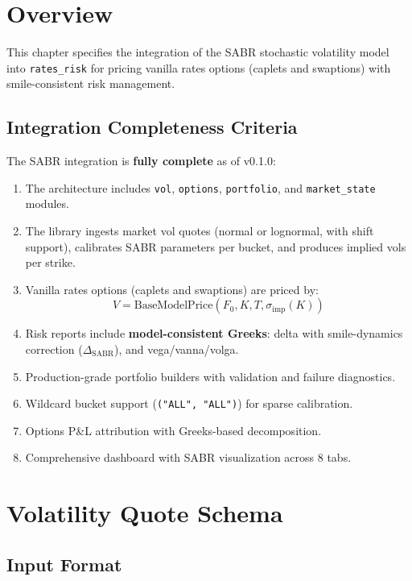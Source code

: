 \documentclass[12pt,a4paper]{report}
\newcommand{\code}[1]{\texttt{#1}}
\begin{document}
\section{Overview}

This chapter specifies the integration of the SABR stochastic volatility model into \code{rates_risk} for pricing vanilla rates options (caplets and swaptions) with smile-consistent risk management.

\subsection{Integration Completeness Criteria}

The SABR integration is \textbf{fully complete} as of v0.1.0:
\begin{enumerate}[leftmargin=1.2em,itemsep=0.2em]
    \item \checkmark The architecture includes \code{vol}, \code{options}, \code{portfolio}, and \code{market\_state} modules.
    \item \checkmark The library ingests market vol quotes (normal or lognormal, with shift support), calibrates SABR parameters per bucket, and produces implied vols per strike.
    \item \checkmark Vanilla rates options (caplets and swaptions) are priced by:
    \[
    V = \text{BaseModelPrice}(F_0,K,T,\sigma_{\text{imp}}(K))
    \]
    \item \checkmark Risk reports include \textbf{model-consistent Greeks}: delta with smile-dynamics correction ($\Delta_{\text{SABR}}$), and vega/vanna/volga.
    \item \checkmark Production-grade portfolio builders with validation and failure diagnostics.
    \item \checkmark Wildcard bucket support (\code{("ALL", "ALL")}) for sparse calibration.
    \item \checkmark Options P\&L attribution with Greeks-based decomposition.
    \item \checkmark Comprehensive dashboard with SABR visualization across 8 tabs.
\end{enumerate}

\section{Volatility Quote Schema}

\subsection{Input Format}
\end{document}
